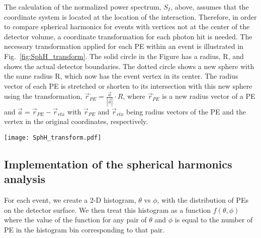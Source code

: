 The calculation of the normalized power spectrum, $S_I$, above, assumes that the coordinate system is located at the location of the interaction.  Therefore, in order to compare spherical harmonics for events with vertices not at the center of the detector volume, a coordinate transformation for each photon hit is needed. The necessary transformation applied for each PE within an event is illustrated in Fig.~\ref{fig:SphH_transform}. The solid circle in the Figure has a radius, R, and shows the actual detector boundaries. The dotted circle shows a new sphere with the same radius R, which now has the event vertex in its center. The radius vector of each PE is stretched or shorten to its intersection with this new sphere using the transformation, $\vec{r}^{,}_{PE} = \frac{\vec{a}}{|\vec{a}|} \cdot R$, where $\vec{r}^{,}_{PE}$ is a new radius vector of a PE and $\vec{a}=\vec{r}_{PE} - \vec{r}_{vtx}$ with $\vec{r}_{PE}$ and $\vec{r}_{vtx}$ being radius vectors of the PE and the vertex in the original coordinates, respectively.

\begin{figure*}[h]
  \centering
  \texttt{[image: SphH\_transform.pdf]}
  \caption{Coordinate transformation applied to events that are
    off-center. Solid circle schematically shows actual detector
    boundaries. Dotted circle shows a new sphere of radius R$=$6.5~m
    with the event vertex position in the center. The radius vector of
    each photon hit is stretched or shorten until intersection with
    this new sphere using transformation $\vec{r}^{,}_{hit} =
    \frac{\vec{a}}{|\vec{a}|} \cdot R$. Where $\vec{r}^{,}_{hit}$ is a
    new radius vector of the photon hit, $R$ is detector sphere radius,
    and $\vec{a}=\vec{r}_{hit} - \vec{r}_{vtx}$ with $\vec{r}_{hit}$
    and $\vec{r}_{vtx}$ being radius vectors of the photon hit and
    vertex position in original coordinates and correspondingly.}
  \label{fig:SphH_transform}
\end{figure*}


\subsection{Implementation of the spherical harmonics analysis}

For each event, we create a 2-D histogram, $\theta$ vs $\phi$, with the distribution of PEs on the detector surface. We then treat this histogram as a function $f(\theta,\phi)$ where the value of the function for any pair of $\theta$ and $\phi$ is equal to the number of PE in the histogram bin corresponding to that pair.

